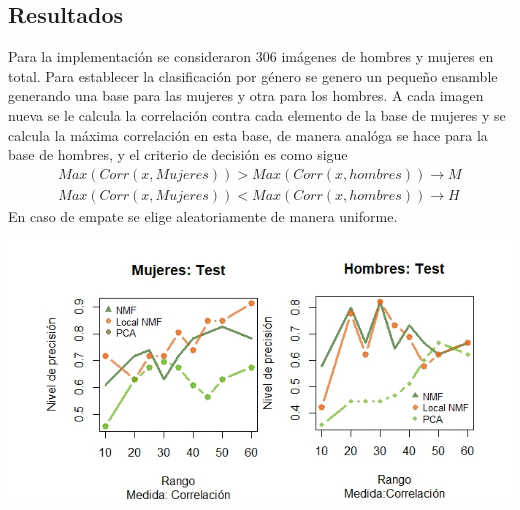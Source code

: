 \documentclass[a0,portrait]{a0poster}
\begin{document}
\begin{multicols}{3}

\color{SaddleBrown} %

\section*{Resultados}
Para la implementación se consideraron 306 imágenes de hombres y mujeres en total. Para establecer la clasificación por género se genero un pequeño ensamble generando una base para las mujeres y otra para los hombres. A cada imagen nueva se le calcula la correlación contra cada elemento de la base de mujeres y se calcula la máxima correlación en esta base, de manera analóga se hace para la base de hombres, y el criterio de decisión es como sigue
\begin{multline*}
Max(Corr(x,Mujeres))>Max(Corr(x,hombres))\rightarrow M\\ Max(Corr(x,Mujeres))<Max(Corr(x,hombres))\rightarrow H
\end{multline*}
En caso de empate se elige aleatoriamente de manera uniforme.
\color{Black} %
\begin{center}\vspace{0.5cm}
\includegraphics[width=1.0\linewidth]{resultados}
\end{center}%
\begin{center}\vspace{0.5cm}

\end{center}
\end{multicols}
\end{document}
